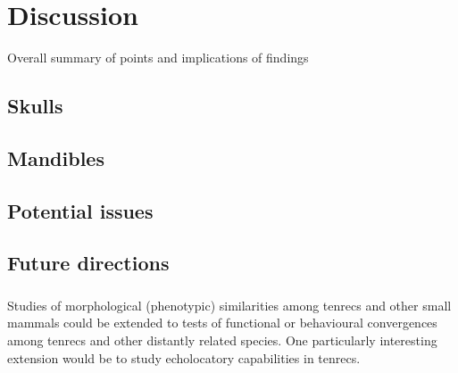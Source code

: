 \chapter{Discussion}
\label{chap:discussion}



\noindent
Overall summary of points and implications of findings

\section{Skulls}

\section{Mandibles}

\section{Potential issues}

\section{Future directions}





\subsection{}
	Studies of morphological (phenotypic) similarities among tenrecs and other small mammals could be extended to tests of functional or behavioural convergences among tenrecs and other distantly related species.
	One particularly interesting extension would be to study echolocatory capabilities in tenrecs.

